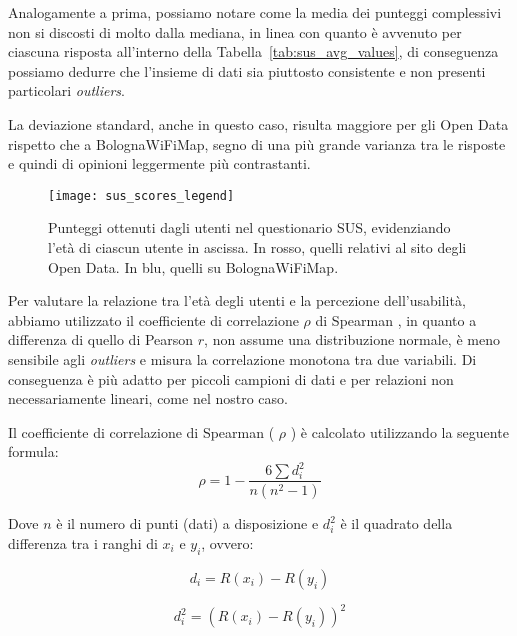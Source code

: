 Analogamente a prima, possiamo notare come la media dei punteggi complessivi non si discosti di molto dalla mediana, in linea con quanto è avvenuto per ciascuna risposta all'interno della Tabella~\ref{tab:sus_avg_values}, di conseguenza possiamo dedurre che l'insieme di dati sia piuttosto consistente e non presenti particolari \textit{outliers}.

La deviazione standard, anche in questo caso, risulta maggiore per gli Open Data rispetto che a BolognaWiFiMap, segno di una più grande varianza tra le risposte e quindi di opinioni leggermente più contrastanti.

\begin{figure}[H]
    \centering
    \texttt{[image: sus\_scores\_legend]}
    \caption[Punteggi ottenuti nel questionario SUS]{Punteggi ottenuti dagli utenti nel questionario SUS, evidenziando l'età di ciascun utente in ascissa. In rosso, quelli relativi al sito degli Open Data. In blu, quelli su BolognaWiFiMap.}
    \label{fig:sus_scores}
\end{figure}

Per valutare la relazione tra l'età degli utenti e la percezione dell'usabilità, abbiamo utilizzato il coefficiente di correlazione \( \rho \) di Spearman , in quanto a differenza di quello di Pearson \( r \), non assume una distribuzione normale, è meno sensibile agli \textit{outliers} e misura la correlazione monotona tra due variabili. Di conseguenza è più adatto per piccoli campioni di dati e per relazioni non necessariamente lineari, come nel nostro caso.

Il coefficiente di correlazione di Spearman ( \( \rho \) ) è calcolato utilizzando la seguente formula:
\begin{equation}
    \rho = 1 - \frac{6 \sum d_i^2}{n(n^2 - 1)}
    \label{eq:spearman_correlation_coefficient}
\end{equation}

\newpage

Dove \( n \) è il numero di punti (dati) a disposizione e \( d_i^2 \) è il quadrato della differenza tra i ranghi di \( x_i \) e \( y_i \), ovvero:

\begin{equation}
    d_i = R(x_i) - R(y_i)
    \label{eq:rank_difference}
\end{equation}

\begin{equation}
    d_i^2 = (R(x_i) - R(y_i))^2
    \label{eq:squared_rank_difference}
\end{equation}


